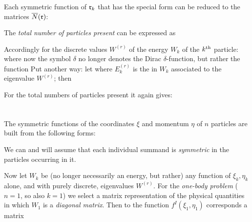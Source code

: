 \begin{paper}{1}
Each symmetric function of $\mathfrak{r}_k$ that has the special form
can be reduced to the matrices $\overline{N}(\mathfrak{r})$:

The \textit{total number of particles present} can be expressed as

Accordingly for the discrete values $W^{(r)}$ of the energy $W_k$ of the ${k}^\text{th}$ particle:
where now the symbol $\delta$ no longer denotes the Dirac $\delta$-function, but rather the function
Put another way: let
where $E_k^{(r)}$ is the \textit{} in $W_k$ associated to the eigenvalue $W^{(r)}$; then

For the total numbers of particles present it again gives:

\section{} The symmetric functions of the coordinates $\xi$ and momentum $\eta$ of $n$ particles are built from the following forms:

We can and will assume that each individual summand is \textit{symmetric} in the particles occurring in it. 

Now let $W_k$ be (no longer necessarily an energy, but rather) any function of $\xi_k,\eta_k$ alone, and with purely discrete,  eigenvalues $W^{(r)}$. For the \textit{one-body problem} ($n=1$, so also $k=1$) we select a matrix representation of the physical quantities in which $W_1$ is a \textit{diagonal matrix}. Then to the function $f^I(\xi_1,\eta_1)$ corresponds a matrix


\end{paper}
